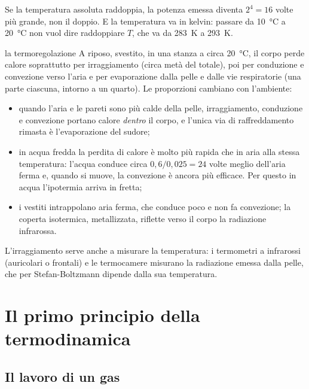 \begin{attenzione}
Se la temperatura assoluta raddoppia, la potenza emessa diventa $2^{4} = 16$ volte più grande, non il doppio. E la temperatura va in kelvin: passare da \SI{10}{\celsius} a \SI{20}{\celsius} non vuol dire raddoppiare $T$, che va da \SI{283}{\kelvin} a \SI{293}{\kelvin}.
\end{attenzione}



\begin{applicazione}{la termoregolazione}
A riposo, svestito, in una stanza a circa \SI{20}{\celsius}, il corpo perde calore soprattutto per irraggiamento (circa metà del totale), poi per conduzione e convezione verso l'aria e per evaporazione dalla pelle e dalle vie respiratorie (una parte ciascuna, intorno a un quarto). Le proporzioni cambiano con l'ambiente:
\begin{itemize}
  \item quando l'aria e le pareti sono più calde della pelle, irraggiamento, conduzione e convezione portano calore \emph{dentro} il corpo, e l'unica via di raffreddamento rimasta è l'evaporazione del sudore;
  \item in acqua fredda la perdita di calore è molto più rapida che in aria alla stessa temperatura: l'acqua conduce circa $0{,}6/0{,}025 = 24$ volte meglio dell'aria ferma e, quando si muove, la convezione è ancora più efficace. Per questo in acqua l'ipotermia arriva in fretta;
  \item i vestiti intrappolano aria ferma, che conduce poco e non fa convezione; la coperta isotermica, metallizzata, riflette verso il corpo la radiazione infrarossa.
\end{itemize}
L'irraggiamento serve anche a misurare la temperatura: i termometri a infrarossi (auricolari o frontali) e le termocamere misurano la radiazione emessa dalla pelle, che per Stefan-Boltzmann dipende dalla sua temperatura.
\end{applicazione}

\section{Il primo principio della termodinamica}
\label{sec:ud5-primo}

\subsection{Il lavoro di un gas}

